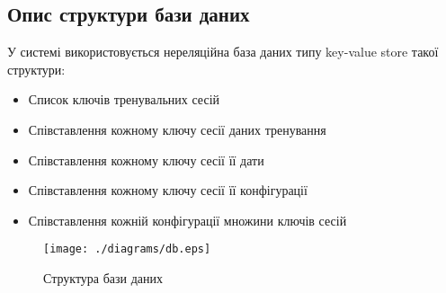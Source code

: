 \subsection{Опис структури бази даних}

У системі використовується нереляційна база даних типу key-value store такої структури:
\begin{itemize}
  \item Список ключів тренувальних сесій
  \item Співставлення кожному ключу сесії даних тренування
  \item Співставлення кожному ключу сесії її дати
  \item Співставлення кожному ключу сесії її конфігурації
  \item Співставлення кожній конфігурації множини ключів сесій
\end{itemize}

\begin{figure}[here]
  \centering
  \texttt{[image: ./diagrams/db.eps]}
  \caption{Структура бази даних}
\end{figure}